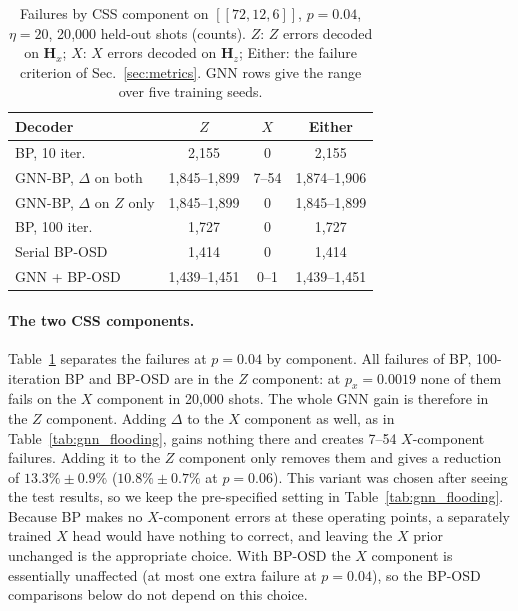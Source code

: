 \documentclass[a4paper,twocolumn,11pt,nopdfoutputerror]{quantumarticle}
\newcommand{\Hmat}{\mathbf{H}}
\newcommand{\code}[3]{\ensuremath{[\![#1,#2,#3]\!]}}
\begin{document}
\begin{table}[t]
\centering
\caption{Failures by CSS component on $\code{72}{12}{6}$, $p=0.04$,
         $\eta=20$, 20{,}000 held-out shots (counts). $Z$: $Z$ errors
         decoded on $\Hmat_x$; $X$: $X$ errors decoded on $\Hmat_z$;
         Either: the failure criterion of Sec.~\ref{sec:metrics}. GNN rows
         give the range over five training seeds.}
\label{tab:components}
\footnotesize
\setlength{\tabcolsep}{3pt}
\begin{tabular}{@{}lccc@{}}
\toprule
Decoder & $Z$ & $X$ & Either \\
\midrule
BP, 10 iter. & 2{,}155 & 0 & 2{,}155 \\
GNN-BP, $\Delta$ on both & 1{,}845--1{,}899 & 7--54 & 1{,}874--1{,}906 \\
GNN-BP, $\Delta$ on $Z$ only & 1{,}845--1{,}899 & 0 & 1{,}845--1{,}899 \\
BP, 100 iter. & 1{,}727 & 0 & 1{,}727 \\
Serial BP-OSD & 1{,}414 & 0 & 1{,}414 \\
GNN + BP-OSD & 1{,}439--1{,}451 & 0--1 & 1{,}439--1{,}451 \\
\bottomrule
\end{tabular}
\end{table}

\paragraph{The two CSS components.} Table~\ref{tab:components} separates
the failures at $p=0.04$ by component. All failures of BP, 100-iteration
BP and BP-OSD are in the $Z$ component: at $p_x=0.0019$ none of them
fails on the $X$ component in 20{,}000 shots. The whole GNN gain is
therefore in the $Z$ component. Adding $\Delta$ to the $X$ component as
well, as in Table~\ref{tab:gnn_flooding}, gains nothing there and creates
7--54 $X$-component failures. Adding it to the $Z$ component only removes
them and gives a reduction of $13.3\%\pm0.9\%$ ($10.8\%\pm0.7\%$ at $p=0.06$). This
variant was chosen after seeing the test results, so we keep the
pre-specified setting in Table~\ref{tab:gnn_flooding}. Because BP makes
no $X$-component errors at these operating points, a separately trained
$X$ head would have nothing to correct, and leaving the $X$ prior
unchanged is the appropriate choice. With BP-OSD the $X$ component is
essentially unaffected (at most one extra failure at $p=0.04$), so the
BP-OSD comparisons below do not depend on this choice.
\end{document}
